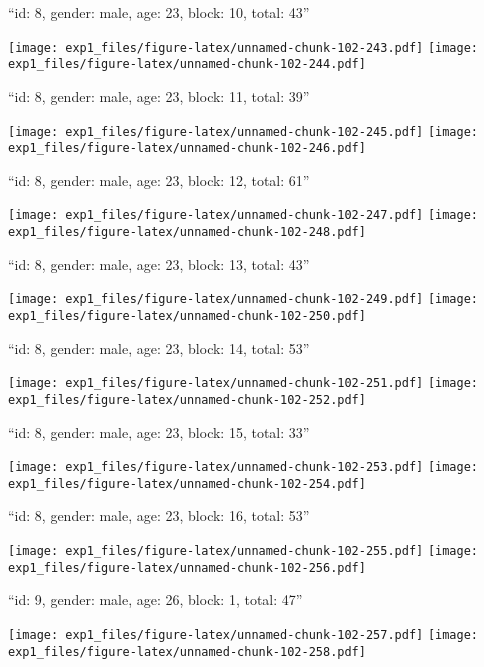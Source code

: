 \documentclass[11pt,,]{article}
\begin{document}
\newpage
[1] 

``id: 8, gender: male, age: 23, block: 10, total: 43''

\texttt{[image: exp1\_files/figure-latex/unnamed-chunk-102-243.pdf]}
\texttt{[image: exp1\_files/figure-latex/unnamed-chunk-102-244.pdf]}

\newpage
[1] 

``id: 8, gender: male, age: 23, block: 11, total: 39''

\texttt{[image: exp1\_files/figure-latex/unnamed-chunk-102-245.pdf]}
\texttt{[image: exp1\_files/figure-latex/unnamed-chunk-102-246.pdf]}

\newpage
[1] 

``id: 8, gender: male, age: 23, block: 12, total: 61''

\texttt{[image: exp1\_files/figure-latex/unnamed-chunk-102-247.pdf]}
\texttt{[image: exp1\_files/figure-latex/unnamed-chunk-102-248.pdf]}

\newpage
[1] 

``id: 8, gender: male, age: 23, block: 13, total: 43''

\texttt{[image: exp1\_files/figure-latex/unnamed-chunk-102-249.pdf]}
\texttt{[image: exp1\_files/figure-latex/unnamed-chunk-102-250.pdf]}

\newpage
[1] 

``id: 8, gender: male, age: 23, block: 14, total: 53''

\texttt{[image: exp1\_files/figure-latex/unnamed-chunk-102-251.pdf]}
\texttt{[image: exp1\_files/figure-latex/unnamed-chunk-102-252.pdf]}

\newpage
[1] 

``id: 8, gender: male, age: 23, block: 15, total: 33''

\texttt{[image: exp1\_files/figure-latex/unnamed-chunk-102-253.pdf]}
\texttt{[image: exp1\_files/figure-latex/unnamed-chunk-102-254.pdf]}

\newpage
[1] 

``id: 8, gender: male, age: 23, block: 16, total: 53''

\texttt{[image: exp1\_files/figure-latex/unnamed-chunk-102-255.pdf]}
\texttt{[image: exp1\_files/figure-latex/unnamed-chunk-102-256.pdf]}

\newpage
[1] 

``id: 9, gender: male, age: 26, block: 1, total: 47''

\texttt{[image: exp1\_files/figure-latex/unnamed-chunk-102-257.pdf]}
\texttt{[image: exp1\_files/figure-latex/unnamed-chunk-102-258.pdf]}
\end{document}
